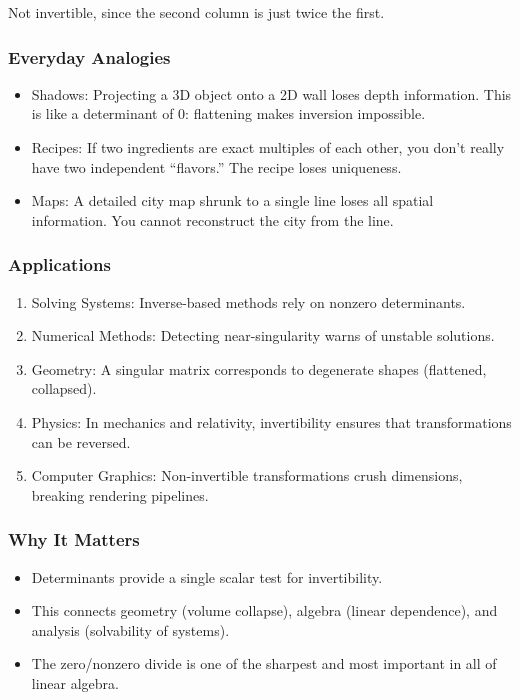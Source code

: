 \documentclass[
  letterpaper,
  DIV=11,
  numbers=noendperiod]{scrreprt}
\providecommand{\tightlist}{%
  \setlength{\itemsep}{0pt}\setlength{\parskip}{0pt}}
\begin{document}
Not invertible, since the second column is just twice the first.

\subsubsection{Everyday Analogies}\label{everyday-analogies-52}

\begin{itemize}
\tightlist
\item
  Shadows: Projecting a 3D object onto a 2D wall loses depth
  information. This is like a determinant of 0: flattening makes
  inversion impossible.
\item
  Recipes: If two ingredients are exact multiples of each other, you
  don't really have two independent ``flavors.'' The recipe loses
  uniqueness.
\item
  Maps: A detailed city map shrunk to a single line loses all spatial
  information. You cannot reconstruct the city from the line.
\end{itemize}

\subsubsection{Applications}\label{applications-18}

\begin{enumerate}
\def\labelenumi{\arabic{enumi}.}
\tightlist
\item
  Solving Systems: Inverse-based methods rely on nonzero determinants.
\item
  Numerical Methods: Detecting near-singularity warns of unstable
  solutions.
\item
  Geometry: A singular matrix corresponds to degenerate shapes
  (flattened, collapsed).
\item
  Physics: In mechanics and relativity, invertibility ensures that
  transformations can be reversed.
\item
  Computer Graphics: Non-invertible transformations crush dimensions,
  breaking rendering pipelines.
\end{enumerate}

\subsubsection{Why It Matters}\label{why-it-matters-52}

\begin{itemize}
\tightlist
\item
  Determinants provide a single scalar test for invertibility.
\item
  This connects geometry (volume collapse), algebra (linear dependence),
  and analysis (solvability of systems).
\item
  The zero/nonzero divide is one of the sharpest and most important in
  all of linear algebra.
\end{itemize}
\end{document}
